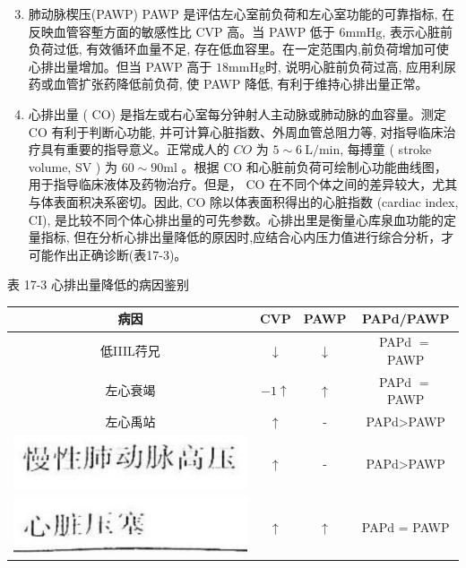 \documentclass[10pt]{article}
\begin{document}
\begin{enumerate}
  \setcounter{enumi}{2}
  \item 肺动脉楔压(PAWP) PAWP 是评估左心室前负荷和左心室功能的可靠指标, 在反映血管容塹方面的敏感性比 CVP 高。当 PAWP 低于 $6 \mathrm{mmHg}$, 表示心脏前负荷过低, 有效循环血量不足, 存在低血容里。在一定范围内,前负荷增加可使心排出量增加。但当 PAWP 高于 $18 \mathrm{mmHg}$时, 说明心脏前负荷过高, 应用利尿药或血管扩张药降低前负荷, 使 PAWP 降低, 有利于维持心排出量正常。

  \item 心排出量 ( CO) 是指左或右心室每分钟射人主动脉或肺动脉的血容量。测定 $\mathrm{CO}$ 有利于判断心功能, 并可计算心脏指数、外周血管总阻力等, 对指导临床治疗具有重要的指导意义。正常成人的 $C O$ 为 $5 \sim 6 \mathrm{~L} / \mathrm{min}$, 每搏童 ( stroke volume, $\mathrm{SV}$ ) 为 $60 \sim 90 \mathrm{ml}$ 。根据 $\mathrm{CO}$ 和心脏前负荷可绘制心功能曲线图，用于指导临床液体及药物治疗。但是， $\mathrm{CO}$ 在不同个体之间的差异较大，尤其与体表面积决系密切。因此, CO 除以体表面积得出的心脏指数 (cardiac index, CI), 是比较不同个体心排出量的可先参数。心排出里是衡量心库泉血功能的定量指标, 但在分析心排出量降低的原因时,应结合心内压力值进行综合分析，才可能作出正确诊断(表17-3)。

\end{enumerate}

表 17-3 心排出量降低的病因鉴别

\begin{center}
\begin{tabular}{|c|c|c|c|}
\hline
病因 & CVP & PAWP & PAPd/PAWP \\
\hline
低IIIL荇兄 & $\downarrow$ & $\downarrow$ & PAPd $=$ PAWP \\
\hline
左心衰竭 & $-1 \uparrow$ & $\uparrow$ & PAPd $=$ PAWP \\
\hline
左心禹站 & $\uparrow$ & - & PAPd>PAWP \\
\hline
\includegraphics[max width=\textwidth]{2024_07_09_002a177993bd97d1d6d7g-180}
 & $\uparrow$ & - & PAPd>PAWP \\
\hline
\includegraphics[max width=\textwidth]{2024_07_09_002a177993bd97d1d6d7g-180(1)}
 & $\uparrow$ & $\uparrow$ & PAPd = PAWP \\
\hline
\end{tabular}
\end{center}
\end{document}

